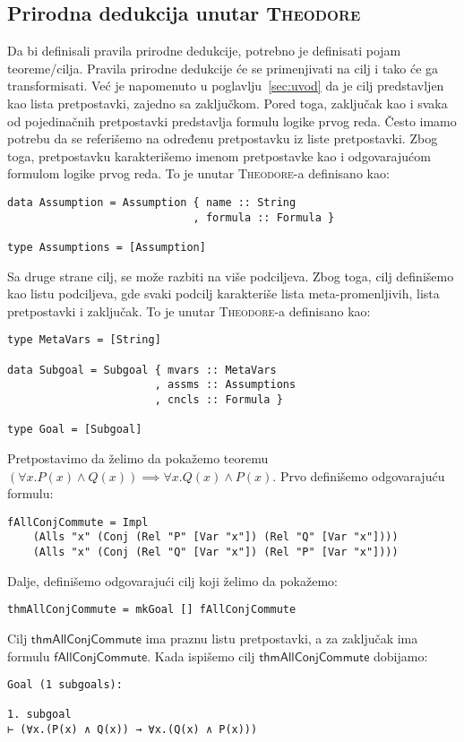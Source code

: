 \documentclass[a4paper,10pt]{article}
\theoremstyle{definition}
\begin{document}
\subsection{Prirodna dedukcija unutar \textsc{Theodore}}
\label{sub:theodore_natded}

Da bi definisali pravila prirodne dedukcije, potrebno je definisati pojam teoreme/cilja. Pravila prirodne dedukcije će se primenjivati na cilj i tako će ga transformisati. Već je napomenuto u poglavlju~\ref{sec:uvod} da je cilj predstavljen kao lista pretpostavki, zajedno sa zaključkom. Pored toga, zaključak kao i svaka od pojedinačnih pretpostavki predstavlja formulu logike prvog reda. Često imamo potrebu da se referišemo na određenu pretpostavku iz liste pretpostavki. Zbog toga, pretpostavku karakterišemo imenom pretpostavke kao i odgovarajućom formulom logike prvog reda. To je unutar \textsc{Theodore}-a definisano kao:
\begin{lstlisting}
data Assumption = Assumption { name :: String
                             , formula :: Formula }

type Assumptions = [Assumption]
\end{lstlisting}

Sa druge strane cilj, se može razbiti na više podciljeva. Zbog toga, cilj definišemo kao listu podciljeva, gde svaki podcilj karakteriše lista meta-promenljivih, lista pretpostavki i zaključak. To je unutar \textsc{Theodore}-a definisano kao:
\begin{lstlisting}
type MetaVars = [String]

data Subgoal = Subgoal { mvars :: MetaVars
                       , assms :: Assumptions
                       , cncls :: Formula }

type Goal = [Subgoal]
\end{lstlisting}

Pretpostavimo da želimo da pokažemo teoremu $(\forall x. P (x) \land Q (x)) \implies \forall x. Q (x) \land P (x)$. Prvo definišemo odgovarajuću formulu:
\begin{lstlisting}
fAllConjCommute = Impl 
    (Alls "x" (Conj (Rel "P" [Var "x"]) (Rel "Q" [Var "x"]))) 
    (Alls "x" (Conj (Rel "Q" [Var "x"]) (Rel "P" [Var "x"])))
\end{lstlisting}
Dalje, definišemo odgovarajući cilj koji želimo da pokažemo:
\begin{lstlisting}
thmAllConjCommute = mkGoal [] fAllConjCommute
\end{lstlisting}
Cilj $\mathsf{thmAllConjCommute}$ ima praznu listu pretpostavki, a za zaključak ima formulu $\mathsf{fAllConjCommute}$. Kada ispišemo cilj $\mathsf{thmAllConjCommute}$ dobijamo:
\begin{verbatim}
Goal (1 subgoals):

1. subgoal
⊢ (∀x.(P(x) ∧ Q(x)) → ∀x.(Q(x) ∧ P(x)))
\end{verbatim}
\end{document}
